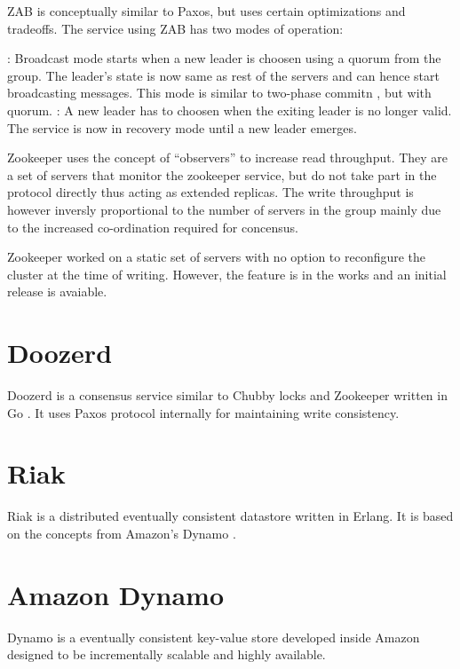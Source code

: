 ZAB is conceptually similar to Paxos, but uses certain optimizations and 
tradeoffs. The service using ZAB has two modes of operation:

\begin{itemize}
    : Broadcast mode starts when a new leader is choosen
    using a quorum from the group. The leader's state is now same as rest of
    the servers and can hence start broadcasting messages.
    This mode is similar to two-phase commitn \citep{Gray78}, but with quorum.
    : A new leader has to choosen when the exiting leader 
    is no longer valid. The service is now in recovery mode until a new leader
    emerges.
\end{itemize}

Zookeeper uses the concept of ``observers'' to increase read throughput. They 
are a set of servers that monitor the zookeeper service, but do not take part
in the protocol directly thus acting as extended replicas. The write throughput
is however inversly proportional to the number of servers in the group mainly
due to the increased co-ordination required for concensus.

Zookeeper worked on a static set of servers with no option to reconfigure the
cluster at the time of writing. However, the feature is in the works 
\citep{zab2012}and an initial release is avaiable.

\section{Doozerd}

Doozerd \citep{doozerd} is a consensus service similar to Chubby locks
 and Zookeeper  written in 
Go \citep{golang}. It uses Paxos protocol internally for maintaining
write consistency.

\section{Riak}

Riak \citep{riak} is a distributed eventually consistent datastore written in 
Erlang. It is based on the concepts from Amazon's Dynamo \citep{DeCandia07}.

\section{Amazon Dynamo}

Dynamo \citep{DeCandia07} is a eventually consistent key-value store developed 
inside Amazon designed to be incrementally scalable and highly available.

